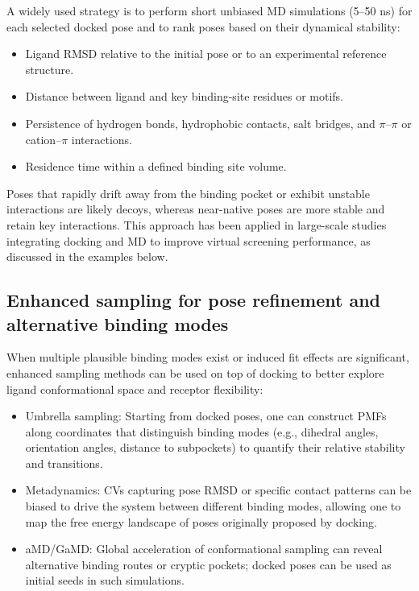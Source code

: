 \documentclass[12pt]{article}
\begin{document}
A widely used strategy is to perform short unbiased MD simulations (5--50 ns) for each selected docked pose and to rank poses based on their dynamical stability:

\begin{itemize}
\item Ligand RMSD relative to the initial pose or to an experimental reference structure.
\item Distance between ligand and key binding-site residues or motifs.
\item Persistence of hydrogen bonds, hydrophobic contacts, salt bridges, and \(\pi\)–\(\pi\) or cation–\(\pi\) interactions.
\item Residence time within a defined binding site volume.
\end{itemize}

Poses that rapidly drift away from the binding pocket or exhibit unstable interactions are likely decoys, whereas near-native poses are more stable and retain key interactions. This approach has been applied in large-scale studies integrating docking and MD to improve virtual screening performance, as discussed in the examples below.

\subsection{Enhanced sampling for pose refinement and alternative binding modes}

When multiple plausible binding modes exist or induced fit effects are significant, enhanced sampling methods can be used on top of docking to better explore ligand conformational space and receptor flexibility:

\begin{itemize}
\item Umbrella sampling: Starting from docked poses, one can construct PMFs along coordinates that distinguish binding modes (e.g., dihedral angles, orientation angles, distance to subpockets) to quantify their relative stability and transitions.
\item Metadynamics: CVs capturing pose RMSD or specific contact patterns can be biased to drive the system between different binding modes, allowing one to map the free energy landscape of poses originally proposed by docking.
\item aMD/GaMD: Global acceleration of conformational sampling can reveal alternative binding routes or cryptic pockets; docked poses can be used as initial seeds in such simulations.
\end{itemize}
\end{document}
